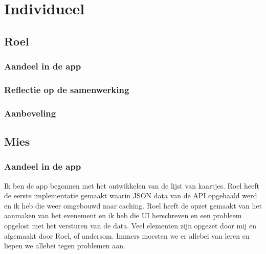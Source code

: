 \documentclass[dutch]{report}
\begin{document}
	\newpage
	\section{Individueel}
	
	\subsection{Roel}

	\subsubsection{Aandeel in de app}
	\subsubsection{Reflectie op de samenwerking}
	\subsubsection{Aanbeveling}
	
	\subsection{Mies}

	\subsubsection{Aandeel in de app}
	Ik ben de app begonnen met het ontwikkelen van de lijst van kaartjes. Roel heeft de eerste implementatie gemaakt waarin JSON data 
	van de API opgehaald werd en ik heb die weer omgebouwd naar caching. Roel heeft de opzet gemaakt van het aanmaken van het evenement
	en ik heb die UI herschreven en een probleem opgelost met het versturen van de data. Veel elementen zijn opgezet door mij en afgemaakt
	door Roel, of andersom. Immers moesten we er allebei van leren en liepen we allebei tegen problemen aan. 
	
\end{document}
